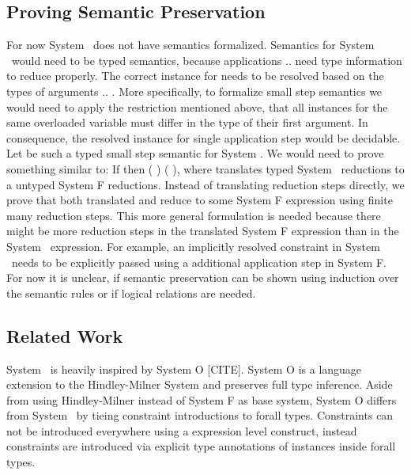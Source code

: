 \subsection{Proving Semantic Preservation }
For now System \Fo\ does not have semantics formalized.
Semantics for System \Fo\ would need to be typed semantics, because applications     $..$   need type information to reduce properly.
The correct instance for  needs to be resolved based on the types of arguments  $..$ . 
More specifically, to formalize small step semantics we would need to apply the restriction mentioned above, that all instances for the same overloaded variable  must differ in the type of their first argument. 
In consequence, the resolved instance for single application step     would be decidable.
Let    be such a typed small step semantic for System \Fo. We would need to prove something similar to: If    then  \Constr{[}  \Constr{]} (   )  (   ), where  translates typed System \Fo\ reductions to a untyped System F reductions.
Instead of translating reduction steps directly, we prove that both translated  and  reduce to some System F expression  using finite many reduction steps.
This more general formulation is needed because there might be more reduction steps in the translated System F expression than in the System \Fo\ expression. 
For example, an implicitly resolved constraint in System \Fo\ needs to be explicitly passed using a additional application step in System F. 
For now it is unclear, if semantic preservation can be shown using induction over the semantic rules or if logical relations are needed.

\subsection{Related Work}
System \Fo\ is heavily inspired by System O [CITE]. System O is a language extension to the Hindley-Milner System and preserves full type inference. 
Aside from using Hindley-Milner instead of System F as base system, System O differs from System \Fo\ by tieing constraint introductions to forall types. 
Constraints can not be introduced everywhere using a expression level construct, instead constraints are introduced via explicit type annotations of instances inside forall types. 

